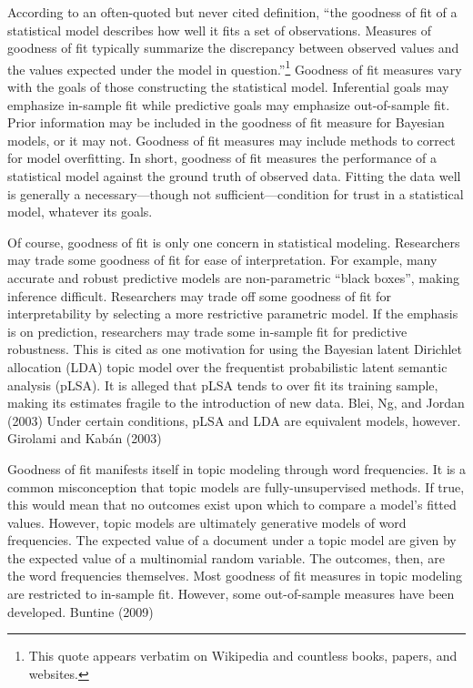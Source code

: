 \documentclass[conference,final,]{IEEEtran}
\begin{document}
According to an often-quoted but never cited definition, ``the goodness
of fit of a statistical model describes how well it fits a set of
observations. Measures of goodness of fit typically summarize the
discrepancy between observed values and the values expected under the
model in question.''\footnote{This quote appears verbatim on Wikipedia
  and countless books, papers, and websites.} Goodness of fit measures
vary with the goals of those constructing the statistical model.
Inferential goals may emphasize in-sample fit while predictive goals may
emphasize out-of-sample fit. Prior information may be included in the
goodness of fit measure for Bayesian models, or it may not. Goodness of
fit measures may include methods to correct for model overfitting. In
short, goodness of fit measures the performance of a statistical model
against the ground truth of observed data. Fitting the data well is
generally a necessary---though not sufficient---condition for trust in a
statistical model, whatever its goals.

Of course, goodness of fit is only one concern in statistical modeling.
Researchers may trade some goodness of fit for ease of interpretation.
For example, many accurate and robust predictive models are
non-parametric ``black boxes'', making inference difficult. Researchers
may trade off some goodness of fit for interpretability by selecting a
more restrictive parametric model. If the emphasis is on prediction,
researchers may trade some in-sample fit for predictive robustness. This
is cited as one motivation for using the Bayesian latent Dirichlet
allocation (LDA) topic model over the frequentist probabilistic latent
semantic analysis (pLSA). It is alleged that pLSA tends to over fit its
training sample, making its estimates fragile to the introduction of new
data. Blei, Ng, and Jordan (2003) Under certain conditions, pLSA and LDA
are equivalent models, however. Girolami and Kabán (2003)

Goodness of fit manifests itself in topic modeling through word
frequencies. It is a common misconception that topic models are
fully-unsupervised methods. If true, this would mean that no outcomes
exist upon which to compare a model's fitted values. However, topic
models are ultimately generative models of word frequencies. The
expected value of a document under a topic model are given by the
expected value of a multinomial random variable. The outcomes, then, are
the word frequencies themselves. Most goodness of fit measures in topic
modeling are restricted to in-sample fit. However, some out-of-sample
measures have been developed. Buntine (2009)
\end{document}

